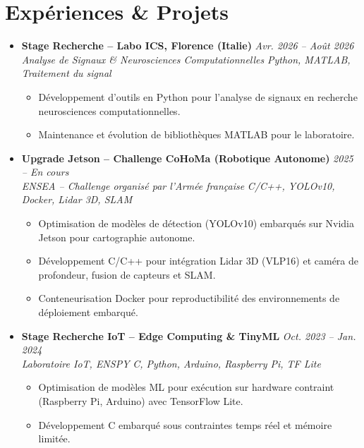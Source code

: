 \documentclass[a4paper,11pt]{article}
\begin{document}
\section{Expériences \& Projets}
\begin{itemize}[leftmargin=*, label={-}]

\item \textbf{Stage Recherche -- Labo ICS, Florence (Italie)} \hfill \textit{Avr. 2026 -- Août 2026} \\
\textit{Analyse de Signaux \& Neurosciences Computationnelles} \hfill \textit{Python, MATLAB, Traitement du signal}
\vspace{-2pt}
    \begin{itemize}[leftmargin=0.4cm, nosep, label=\tiny$\bullet$]
        \item \small{Développement d'outils en Python pour l'analyse de signaux en recherche neurosciences computationnelles.}
        \item \small{Maintenance et évolution de bibliothèques MATLAB pour le laboratoire.}
    \end{itemize}
\vspace{3pt}

\item \textbf{Upgrade Jetson -- Challenge CoHoMa (Robotique Autonome)} \hfill \textit{2025 -- En cours} \\
\textit{ENSEA -- Challenge organisé par l'Armée française} \hfill \textit{C/C++, YOLOv10, Docker, Lidar 3D, SLAM}
\vspace{-2pt}
    \begin{itemize}[leftmargin=0.4cm, nosep, label=\tiny$\bullet$]
        \item \small{Optimisation de modèles de détection (YOLOv10) embarqués sur Nvidia Jetson pour cartographie autonome.}
        \item \small{Développement C/C++ pour intégration Lidar 3D (VLP16) et caméra de profondeur, fusion de capteurs et SLAM.}
        \item \small{Conteneurisation Docker pour reproductibilité des environnements de déploiement embarqué.}
    \end{itemize}
\vspace{3pt}

\item \textbf{Stage Recherche IoT -- Edge Computing \& TinyML} \hfill \textit{Oct. 2023 -- Jan. 2024} \\
\textit{Laboratoire IoT, ENSPY} \hfill \textit{C, Python, Arduino, Raspberry Pi, TF Lite}
\vspace{-2pt}
    \begin{itemize}[leftmargin=0.4cm, nosep, label=\tiny$\bullet$]
        \item \small{Optimisation de modèles ML pour exécution sur hardware contraint (Raspberry Pi, Arduino) avec TensorFlow Lite.}
        \item \small{Développement C embarqué sous contraintes temps réel et mémoire limitée.}
    \end{itemize}
\vspace{3pt}


\end{itemize}
\end{document}
